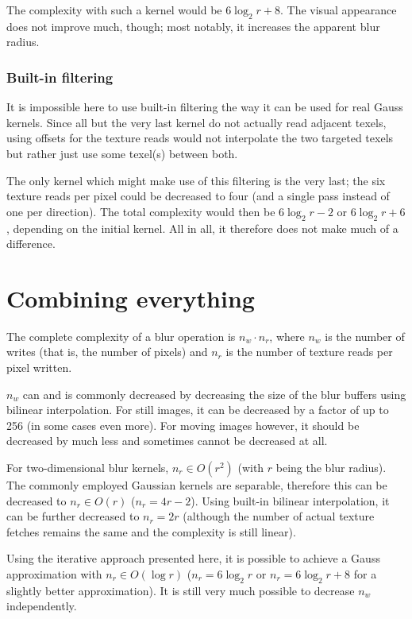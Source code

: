 \documentclass[english,fleqn,10pt,twocolumn]{article}
\begin{document}
The complexity with such a kernel would be $6\log_2 r + 8$. The visual appearance does not improve much, though; most notably, it increases the apparent blur radius.

\subsubsection{Built-in filtering}

It is impossible here to use built-in filtering the way it can be used for real Gauss kernels. Since all but the very last kernel do not actually read adjacent texels, using offsets for the texture
reads would not interpolate the two targeted texels but rather just use some texel(s) between both.

The only kernel which might make use of this filtering is the very last; the six texture reads per pixel could be decreased to four (and a single pass instead of one per direction). The total
complexity would then be $6\log_2 r - 2$ or $6\log_2 r + 6$, depending on the initial kernel. All in all, it therefore does not make much of a difference.


\section{Combining everything}

The complete complexity of a blur operation is $n_w \cdot n_r$, where $n_w$ is the number of writes (that is, the number of pixels) and $n_r$ is the number of texture reads per pixel written.

$n_w$ can and is commonly decreased by decreasing the size of the blur buffers using bilinear interpolation. For still images, it can be decreased by a factor of up to 256 (in some cases even more).
For moving images however, it should be decreased by much less and sometimes cannot be decreased at all.

For two-dimensional blur kernels, $n_r \in O(r^2)$ (with $r$ being the blur radius). The commonly employed Gaussian kernels are separable, therefore this can be decreased to $n_r \in O(r)$
($n_r = 4r - 2$). Using built-in bilinear interpolation, it can be further decreased to $n_r = 2r$ (although the number of actual texture fetches remains the same and the complexity is still linear).

Using the iterative approach presented here, it is possible to achieve a Gauss approximation with $n_r \in O(\log r)$ ($n_r = 6\log_2 r$ or $n_r = 6\log_2 r + 8$ for a slightly better approximation).
It is still very much possible to decrease $n_w$ independently.
\end{document}
